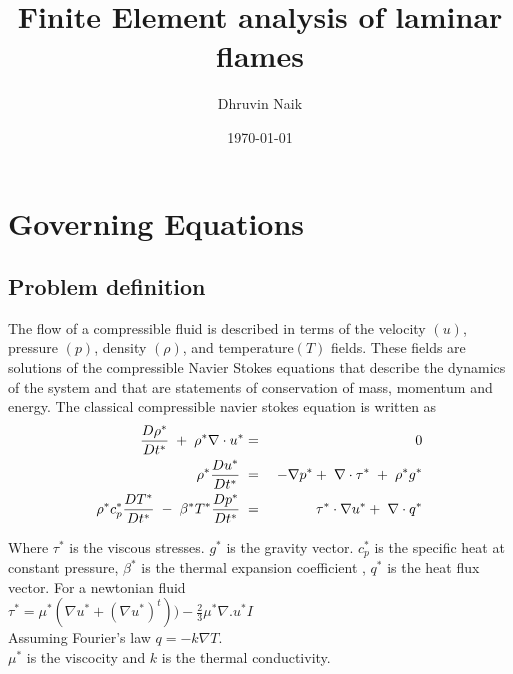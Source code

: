 \documentclass[11pt,a4paper]{article}
\begin{document}
\title{Finite Element analysis of laminar flames}
\author{Dhruvin Naik}
\date{\today}
\maketitle
\begin{abstract}
\end{abstract}
\section{Governing Equations}
\subsection{Problem definition}

The flow of a compressible fluid is described in terms of the velocity $(u)$, pressure $(p)$, density $(\rho)$, and temperature$(T)$ fields. These fields are solutions of the compressible Navier Stokes equations that describe the dynamics of the system
and that are statements of conservation of mass, momentum and energy. The classical compressible navier stokes equation is written as \\
\begin{eqnarray}
\frac{D \rho^*}{D t^*}\hspace{1mm}+\hspace{1mm}\rho^*\nabla\cdot u^* &=& 0 \\
\rho^*\frac{D u^*}{D t^*}\hspace{1mm} &=&\hspace{1mm}-\nabla p^*+\hspace{1mm}\nabla\cdot\tau^*\hspace{1mm}+\hspace{1mm}\rho^* g^* \\
\rho^* c_p^* \frac{D T^*}{D t^*}\hspace{1mm}-\hspace{1mm}\beta^*T^* \frac{D p^*}{D t^*}\hspace{1mm}&=& \hspace{1mm} \tau^*\cdot\nabla u^*  + \hspace{1mm}\nabla\cdot q^* \\
\end{eqnarray}

Where $\tau^*$ is the viscous stresses. $g^*$ is the gravity vector. $c_p^*$ is the specific heat at constant pressure, $\beta^*$ is the thermal expansion coefficient , $q^*$ is the heat flux vector. For a newtonian fluid \\
$\tau^* = \mu^*(\nabla u^* +(\nabla u^*)^t)) - \frac{2}{3}\mu^*\nabla. u^* I$ \\
Assuming Fourier's law $q=-k \nabla T$.\\
$\mu^*$ is the viscocity and $k$ is the thermal conductivity.
\end{document}
